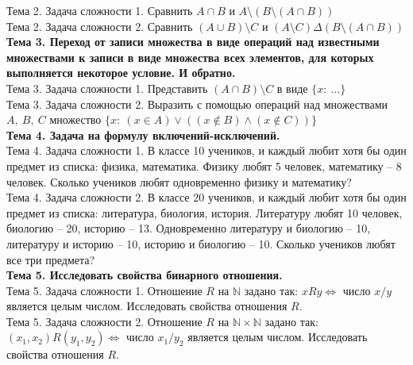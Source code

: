 \documentclass[12pt,oneside]{article}
\theoremstyle{definition}
\begin{document}
Тема 2. Задача сложности 1. Сравнить $A\cap B$ и $A\setminus(B\setminus(A\cap B))$\\

Тема 2. Задача сложности 2. Сравнить $(A\cup B)\setminus C$ и $(A\setminus C)\Delta (B\setminus(A\cap B))$\\



{\bf Тема 3. Переход от записи множества в виде операций над известными множествами к записи в виде множества всех элементов, для которых выполняется некоторое условие. И обратно.}\\

Тема 3. Задача сложности 1. Представить $(A\cap B)\setminus C $ в виде $\{x:\ \dots\}$\\

Тема 3. Задача сложности 2. Выразить с помощью операций над множествами $A,\ B,\ C$ множество $\{x:\ (x\in A) \vee ((x\notin B) \wedge (x\notin C))\}$\\

{\bf Тема 4. Задача на формулу включений-исключений.}\\

Тема 4. Задача сложности 1. В классе 10 учеников, и каждый любит хотя бы один предмет из списка: физика, математика. Физику любят 5 человек, математику -- 8 человек. Сколько учеников любят одновременно физику и математику?\\

Тема 4. Задача сложности 2. В классе 20 учеников, и каждый любит хотя бы один предмет из списка: литература, биология, история. Литературу любят 10 человек, биологию -- 20, историю -- 13. Одновременно литературу и биологию -- 10, литературу и историю -- 10, историю и биологию -- 10. Сколько учеников любят все три предмета?\\

{\bf Тема 5. Исследовать свойства бинарного отношения.}\\

Тема 5. Задача сложности 1. Отношение $R$ на $\mathbb{N}$ задано так: $xRy\iff$ число $x/y$ является целым числом. Исследовать свойства отношения $R$.\\

Тема 5. Задача сложности 2. Отношение $R$ на $\mathbb{N}\times \mathbb{N}$ задано так: $(x_1,x_2)R(y_1,y_2)\iff$ число $x_1/y_2$ является целым числом. Исследовать свойства отношения $R$.\\
\end{document}
